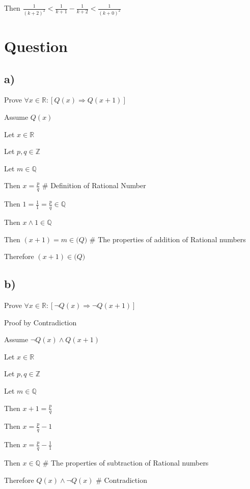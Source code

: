 \documentclass[11pt, oneside]{article}   	%
\begin{document}
\indent \indent Then $\frac{1}{(k+2)^2} <  \frac{1}{k+1} - \frac{1}{k+2} < \frac{1}{(k+0)^2}$






\section{Question}
\subsection{a)}

Prove $\forall x \in \mathbb{R} : [Q(x) \Rightarrow Q(x + 1)] $

Assume $ Q(x)$

Let $x \in \mathbb{R}$

Let $p, q \in \mathbb{Z} $

Let $m \in \mathbb{Q} $

\indent \indent Then $ x = \frac{p}{q}$ 
\# Definition of Rational Number

\indent \indent Then $1 = \frac{1}{1} = \frac{p}{q} \in \mathbb{Q}$ 

\indent \indent Then $x \land 1 \in \mathbb{Q}$ 

\indent \indent Then $ (x+1) = m \in \mathbb(Q) $ 
\# The properties of addition of Rational numbers

\indent \indent Therefore $ (x+1) \in \mathbb(Q)$ 

\subsection{b)}

Prove $\forall x \in \mathbb{R} : [ \neg Q(x) \Rightarrow \neg Q(x + 1)] $

Proof by Contradiction

Assume $ \neg Q(x) \land Q(x + 1) $

Let $x \in \mathbb{R}$

Let $p, q \in \mathbb{Z} $

Let $m \in \mathbb{Q} $

\indent \indent Then $ x + 1 = \frac{p}{q}$ 

\indent \indent Then $ x = \frac{p}{q} - 1$ 

\indent \indent Then $ x = \frac{p}{q} - \frac{1}{1}$ 

\indent \indent Then $ x \in \mathbb{Q}$ 
\# The properties of subtraction of Rational numbers

\indent \indent Therefore $ Q(x) \land \neg Q(x)$ 
\# Contradiction 
\end{document}
